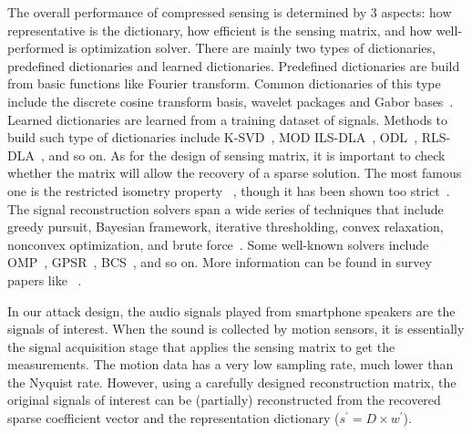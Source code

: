 The overall performance of compressed sensing is determined by 3 aspects: how representative is the dictionary, how efficient is the sensing matrix, and how well-performed is optimization solver.
%
There are mainly two types of dictionaries, predefined dictionaries and learned dictionaries. Predefined dictionaries are build from basic functions like Fourier transform. Common dictionaries of this type include the discrete cosine transform basis, wavelet packages and Gabor bases~\cite{skretting2017sparse}. Learned dictionaries are learned from a training dataset of signals. Methods to build such type of dictionaries include K-SVD~\cite{aharon2006k}, MOD ILS-DLA~\cite{engan2007family}, ODL~\cite{mairal2009online}, RLS-DLA~\cite{skretting2010recursive}, and so on.
%
As for the design of sensing matrix, it is important to check whether the matrix will allow the recovery of a sparse solution. The most famous one is the restricted isometry property ~\cite{candes2008restricted}, though it has been shown too strict~\cite{donoho2009observed}.
%
The signal reconstruction solvers span a wide series of techniques that include 
greedy pursuit, Bayesian framework, iterative thresholding, convex relaxation, nonconvex optimization, and brute force~\cite{tropp2010computational}. Some well-known solvers include
OMP~\cite{tropp2007signal}, GPSR~\cite{figueiredo2007gradient}, BCS~\cite{ji2008bayesian}, and so on. 
%
More information can be found in survey papers like ~\cite{zhang2015survey,skretting2017sparse,rani2018systematic}.




In our attack design, the audio signals played from smartphone speakers are the signals of interest. When the sound is collected by motion sensors, it is essentially the signal acquisition stage that applies the sensing matrix to get the measurements. The motion data has a very low sampling rate, much lower than the Nyquist rate. However, using a carefully designed reconstruction matrix, the original signals of interest can be (partially) reconstructed from the recovered sparse coefficient vector and the representation dictionary ($s^\prime = D \times w^\prime$).
%



